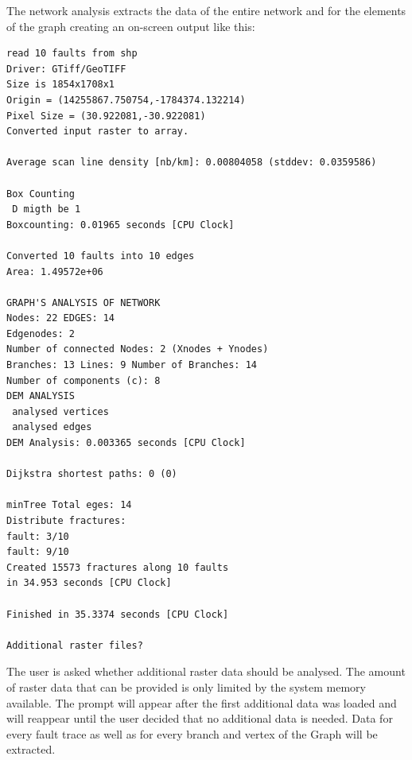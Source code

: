 \documentclass[10pt,a4paper]{article}
\begin{document}
The network analysis extracts the data of the entire network and for the elements of the graph creating an on-screen output like this:
\begin{small}
\begin{verbatim}
read 10 faults from shp
Driver: GTiff/GeoTIFF
Size is 1854x1708x1
Origin = (14255867.750754,-1784374.132214)
Pixel Size = (30.922081,-30.922081)
Converted input raster to array. 

Average scan line density [nb/km]: 0.00804058 (stddev: 0.0359586) 

Box Counting
 D migth be 1
Boxcounting: 0.01965 seconds [CPU Clock] 

Converted 10 faults into 10 edges
Area: 1.49572e+06

GRAPH'S ANALYSIS OF NETWORK 
Nodes: 22 EDGES: 14
Edgenodes: 2
Number of connected Nodes: 2 (Xnodes + Ynodes)
Branches: 13 Lines: 9 Number of Branches: 14
Number of components (c): 8
DEM ANALYSIS 
 analysed vertices 
 analysed edges 
DEM Analysis: 0.003365 seconds [CPU Clock] 

Dijkstra shortest paths: 0 (0) 

minTree Total eges: 14
Distribute fractures: 
fault: 3/10
fault: 9/10
Created 15573 fractures along 10 faults
in 34.953 seconds [CPU Clock] 

Finished in 35.3374 seconds [CPU Clock]

Additional raster files?
\end{verbatim}
\end{small}
The user is asked whether additional raster data should be analysed. The amount of raster data that can be provided is only limited by the system memory available. The prompt will appear after the first additional data was loaded and will reappear until the user decided that no additional data is needed. Data for every fault trace as well as for every branch and vertex of the Graph will be extracted.
\end{document}
